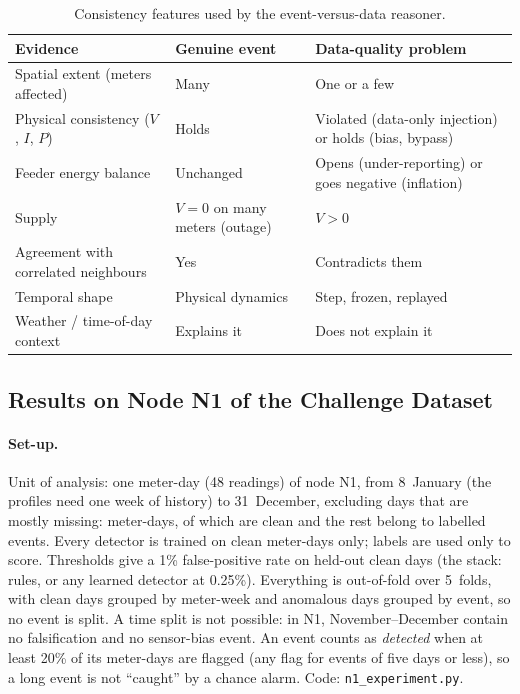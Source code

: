 \documentclass[11pt,a4paper]{article}
\begin{document}
\begin{table}[H]
\centering
\small
\begin{tabularx}{0.85\textwidth}{@{}>{\raggedright\arraybackslash}p{5cm}LL@{}}
\toprule
\textbf{Evidence} & \textbf{Genuine event} & \textbf{Data-quality problem} \\
\midrule
Spatial extent (meters affected) & Many & One or a few \\
Physical consistency ($V$, $I$, $P$) & Holds & Violated (data-only injection) or holds (bias, bypass) \\
Feeder energy balance & Unchanged & Opens (under-reporting) or goes negative (inflation) \\
Supply & $V=0$ on many meters (outage) & $V>0$ \\
Agreement with correlated neighbours & Yes & Contradicts them \\
Temporal shape & Physical dynamics & Step, frozen, replayed \\
Weather / time-of-day context & Explains it & Does not explain it \\
\bottomrule
\end{tabularx}
\caption{Consistency features used by the event-versus-data reasoner.}
\label{tab:reasoner}
\end{table}

\subsection{Results on Node N1 of the Challenge Dataset}
\label{sec:experiment}
\paragraph{Set-up.} Unit of analysis: one meter-day (48 readings) of node N1, from 8~January (the profiles need
one week of history) to 31~December, excluding days that are mostly missing: \nOneDays{} meter-days, of which
\nOneClean{} are clean and the rest belong to \nOneEvents{} labelled events. Every detector is trained on clean
meter-days only; labels are used only to score. Thresholds give a 1\% false-positive rate on held-out clean
days (the stack: rules, or any learned detector at 0.25\%). Everything is out-of-fold over 5~folds, with clean
days grouped by meter-week and anomalous days grouped by event, so no event is split. A time split is not
possible: in N1, November--December contain no falsification and no sensor-bias event. An event counts as
\emph{detected} when at least 20\% of its meter-days are flagged (any flag for events of five days or less),
so a long event is not ``caught'' by a chance alarm. Code: \texttt{n1\_experiment.py}.
\end{document}
